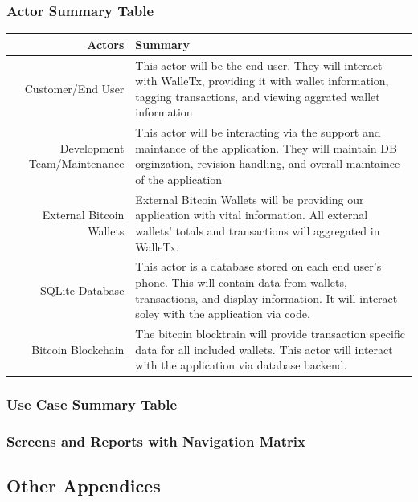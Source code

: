     \subsubsection{Actor Summary Table}
    \begin{table}[H]
      \begin{tabularx}{\textwidth}{r | X}
        Actors                       & Summary\\
        \hline
        Customer/End User            & This actor will be the end user.  They will interact with WalleTx,  providing it with wallet information, tagging transactions, and viewing  aggrated wallet information\\
        Development Team/Maintenance & This actor will be interacting via the support and maintance of the  application.  They will maintain DB orginzation, revision handling, and  overall maintaince of the application\\
        External Bitcoin Wallets     & External Bitcoin Wallets will be providing our application with vital  information.  All external wallets' totals and transactions will  aggregated in WalleTx.\\
        SQLite Database              & This actor is a database stored on each end user's phone. This will  contain data from wallets, transactions, and display information.  It  will interact soley with the application via code.\\
        Bitcoin Blockchain           & The bitcoin blocktrain will provide transaction specific data for all  included wallets. This actor will interact with the application via  database backend.\\
      \end{tabularx}
    \end{table}

    \subsubsection{Use Case Summary Table}

    \subsubsection{Screens and Reports with Navigation Matrix}
  \subsection{Other Appendices}
